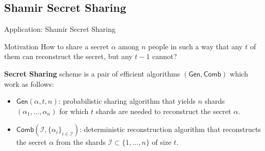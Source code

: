 \documentclass{zkdl-presentation-template}
\begin{document}
    \subsection{Shamir Secret Sharing}
    \begin{frame}{Application: Shamir Secret Sharing}
      \begin{alertblock}{Motivation}
        How to share a secret $\alpha$ among $n$ people in such a way that any $t$ of them can reconstruct the secret, but any $t-1$ cannot?
      \end{alertblock}
      \pause

      \begin{definition}
        \textbf{Secret Sharing} scheme is a pair of efficient algorithms $(\mathsf{Gen}, \mathsf{Comb})$ which work as follows:
        \begin{itemize}
            \item $\mathsf{Gen}(\alpha, t, n)$: probabilistic sharing algorithm that yields $n$ shards $(\alpha_1,\dots,\alpha_n)$ for which $t$ shards are needed to reconstruct the secret $\alpha$.
            \item $\mathsf{Comb}(\mathcal{I}, \{\alpha_i\}_{i \in \mathcal{I}})$: deterministic reconstruction algorithm that reconstructs the secret $\alpha$ from the shards $\mathcal{I} \subset \{1,\dots,n\}$ of size $t$.
        \end{itemize}
      \end{definition}
    \end{frame}
\end{document}
